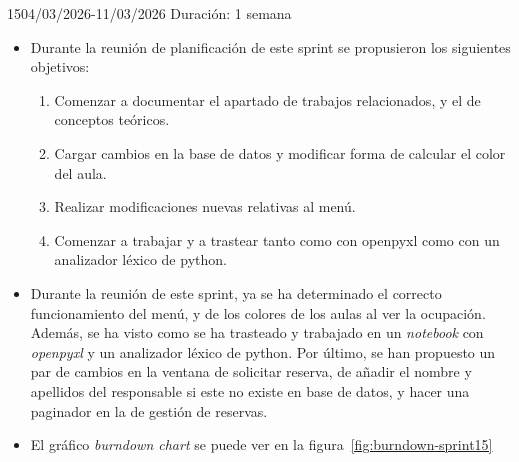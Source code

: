 \begin{Sprint}{15}{04/03/2026-11/03/2026}
	Duración: 1 semana
	\begin{itemize}	
		\item{}
		Durante la reunión de planificación de este sprint se propusieron los siguientes objetivos:
		\begin{enumerate}
			\item Comenzar a documentar el apartado de trabajos relacionados, y el de conceptos teóricos.
			\item Cargar cambios en la base de datos y modificar forma de calcular el color del aula.
			\item Realizar modificaciones nuevas relativas al menú.
			\item Comenzar a trabajar y a trastear tanto como con openpyxl como con un analizador léxico de python.
		\end{enumerate}
		\item{}
		Durante la reunión de este sprint, ya se ha determinado el correcto funcionamiento del menú, y de los colores de los aulas al ver la ocupación. Además, se ha visto como se ha trasteado y trabajado en un \textit{notebook} con \textit{openpyxl} y un analizador léxico de python. Por último, se han propuesto un par de cambios en la ventana de solicitar reserva, de añadir el nombre y apellidos del responsable si este no existe en base de datos, y hacer una paginador en la de gestión de reservas.
		
		\item{}
		El gráfico \textit{burndown chart} se puede ver en la figura~\ref{fig:burndown-sprint15}
	\end{itemize}
\end{Sprint}

